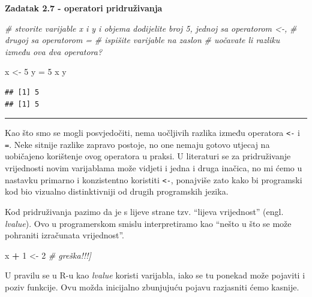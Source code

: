 \documentclass[]{book}
\newenvironment{Shaded}{\begin{snugshade}}{\end{snugshade}}
\newcommand{\DecValTok}[1]{\textcolor[rgb]{0.00,0.00,0.81}{#1}}
\newcommand{\StringTok}[1]{\textcolor[rgb]{0.31,0.60,0.02}{#1}}
\newcommand{\CommentTok}[1]{\textcolor[rgb]{0.56,0.35,0.01}{\textit{#1}}}
\newcommand{\OperatorTok}[1]{\textcolor[rgb]{0.81,0.36,0.00}{\textbf{#1}}}
\newcommand{\NormalTok}[1]{#1}
\theoremstyle{definition}
\theoremstyle{definition}
\theoremstyle{definition}
\theoremstyle{remark}
\begin{document}
\textbf{Zadatak 2.7 - operatori pridruživanja}

\begin{Shaded}
\begin{Highlighting}[]
\CommentTok{# stvorite varijable x i y i objema dodijelite broj 5, jednoj sa operatorom <-, }
\CommentTok{# drugoj sa operatorom =}
\CommentTok{# ispišite varijable na zaslon}
\CommentTok{# uočavate li razliku između ova dva operatora?}
\end{Highlighting}
\end{Shaded}

\begin{Shaded}
\begin{Highlighting}[]
\NormalTok{x <-}\StringTok{ }\DecValTok{5}
\NormalTok{y =}\StringTok{ }\DecValTok{5}
\NormalTok{x}
\NormalTok{y}
\end{Highlighting}
\end{Shaded}

\begin{verbatim}
## [1] 5
## [1] 5
\end{verbatim}

\begin{center}\rule{0.5\linewidth}{\linethickness}\end{center}

Kao što smo se mogli posvjedočiti, nema uočljivih razlika između
operatora \texttt{\textless{}-} i \texttt{=}. Neke sitnije razlike
zapravo postoje, no one nemaju gotovo utjecaj na uobičajeno korištenje
ovog operatora u praksi. U literaturi se za pridruživanje vrijednosti
novim varijablama može vidjeti i jedna i druga inačica, no mi ćemo u
nastavku primarno i konzistentno koristiti \texttt{\textless{}-},
ponajviše zato kako bi programski kod bio vizualno distinktivniji od
drugih programskih jezika.

Kod pridruživanja pazimo da je s lijeve strane tzv. ``lijeva
vrijednost'' (engl. \emph{lvalue}). Ovo u programerskom smislu
interpretiramo kao ``nešto u što se može pohraniti izračunata
vrijednost''.

\begin{Shaded}
\begin{Highlighting}[]
\NormalTok{x }\OperatorTok{+}\StringTok{ }\DecValTok{1}\NormalTok{ <-}\StringTok{ }\DecValTok{2}          \CommentTok{# greška!!!]}
\end{Highlighting}
\end{Shaded}

U pravilu se u R-u kao \emph{lvalue} koristi varijabla, iako se tu
ponekad može pojaviti i poziv funkcije. Ovu možda inicijalno zbunjujuću
pojavu razjasniti ćemo kasnije.
\end{document}
